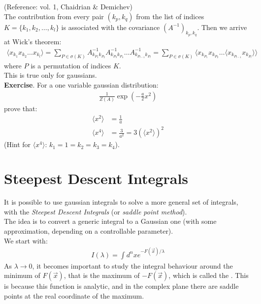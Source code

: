 \documentclass[../template.tex]{subfiles}
\begin{document}
(Reference:  vol. 1, Chaidrian \& Demichev)\\

The contribution from every pair $(k_p, k_q)$  from the list of indices $K = \{k_1, k_2, \dots, k_l\}$ is associated with the covariance $(A^{-1})_{k_p, k_q}$. Then we arrive at Wick's theorem:
\begin{align*}
    \langle x_{k_1} x_{k_2 } \dots x_{k_l}  \rangle = \sum_{P \in \sigma(K)} A^{-1}_{k_{P_1} k_{P_2}} A^{-1}_{k_{P_3}k_{P_4}}\dots A^{-1}_{k_{P_{l-1}} k_{P_l}} = \sum_{P \in \sigma(K)} \langle x_{k_{P_1 }} x_{k_{P_2}} \dots \langle x_{k_{P_{l-1}}} x_{k_{P_l}} \rangle \rangle
\end{align*}
where $P$ is a permutation of indices $K$.  \\
This is true only for gaussians.\\


\textbf{Exercise}.
For a one variable gaussian distribution:
\begin{align*}
    \frac{1}{Z(A)} \exp\left(-\frac{a}{2} x^2 \right) 
\end{align*}
prove that:
\begin{align*}
    \langle x^2 \rangle &= \frac{1}{a} \\
    \langle x^4 \rangle &= \frac{3}{a^2} = 3(\langle x^2 \rangle)^2
\end{align*}
(Hint for $\langle x^4 \rangle$: $k_1 = 1 = k_2 = k_3 = k_4$).

\section{Steepest Descent Integrals}
It is possible to use gaussian integrals to solve a more general set of integrals, with the \textit{Steepest Descent Integrals} (or \textit{saddle point method}).\\

The idea is to convert a generic integral to a Gaussian one (with some approximation, depending on a controllable parameter).\\
We start with:
\begin{align*}
    I(\lambda) = \int d^nx e^{-F(\vec{x})/\lambda}
\end{align*}
As $\lambda \to 0$, it becomes important to study the integral behaviour around the minimum of $F(\vec{x})$, that is the maximum of $-F(\vec{x})$, which is called the . This is because this function is analytic, and in the complex plane there are saddle points at the real coordinate of the maximum.\\
\end{document}

